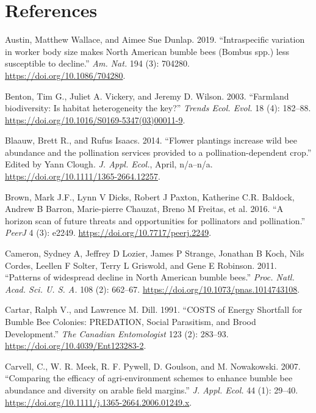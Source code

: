 \documentclass[11pt,]{article}
\begin{document}
\newpage

\hypertarget{references}{%
\section*{References}\label{references}}

\hypertarget{refs}{}
\leavevmode\hypertarget{ref-Austin2019}{}%
Austin, Matthew Wallace, and Aimee Sue Dunlap. 2019. ``Intraspecific
variation in worker body size makes North American bumble bees (Bombus
spp.) less susceptible to decline.'' \emph{Am. Nat.} 194 (3): 704280.
\url{https://doi.org/10.1086/704280}.

\leavevmode\hypertarget{ref-Benton2003}{}%
Benton, Tim G., Juliet A. Vickery, and Jeremy D. Wilson. 2003.
``Farmland biodiversity: Is habitat heterogeneity the key?''
\emph{Trends Ecol. Evol.} 18 (4): 182--88.
\url{https://doi.org/10.1016/S0169-5347(03)00011-9}.

\leavevmode\hypertarget{ref-Blaauw2014}{}%
Blaauw, Brett R., and Rufus Isaacs. 2014. ``Flower plantings increase
wild bee abundance and the pollination services provided to a
pollination-dependent crop.'' Edited by Yann Clough. \emph{J. Appl.
Ecol.}, April, n/a--n/a. \url{https://doi.org/10.1111/1365-2664.12257}.

\leavevmode\hypertarget{ref-Brown2016a}{}%
Brown, Mark J.F., Lynn V Dicks, Robert J Paxton, Katherine C.R. Baldock,
Andrew B Barron, Marie-pierre Chauzat, Breno M Freitas, et al. 2016. ``A
horizon scan of future threats and opportunities for pollinators and
pollination.'' \emph{PeerJ} 4 (3): e2249.
\url{https://doi.org/10.7717/peerj.2249}.

\leavevmode\hypertarget{ref-Cameron2011}{}%
Cameron, Sydney A, Jeffrey D Lozier, James P Strange, Jonathan B Koch,
Nils Cordes, Leellen F Solter, Terry L Griswold, and Gene E Robinson.
2011. ``Patterns of widespread decline in North American bumble bees.''
\emph{Proc. Natl. Acad. Sci. U. S. A.} 108 (2): 662--67.
\url{https://doi.org/10.1073/pnas.1014743108}.

\leavevmode\hypertarget{ref-Cartar1991}{}%
Cartar, Ralph V., and Lawrence M. Dill. 1991. ``COSTS of Energy
Shortfall for Bumble Bee Colonies: PREDATION, Social Parasitism, and
Brood Development.'' \emph{The Canadian Entomologist} 123 (2): 283--93.
\url{https://doi.org/10.4039/Ent123283-2}.

\leavevmode\hypertarget{ref-Carvell2007}{}%
Carvell, C., W. R. Meek, R. F. Pywell, D. Goulson, and M. Nowakowski.
2007. ``Comparing the efficacy of agri-environment schemes to enhance
bumble bee abundance and diversity on arable field margins.'' \emph{J.
Appl. Ecol.} 44 (1): 29--40.
\url{https://doi.org/10.1111/j.1365-2664.2006.01249.x}.
\end{document}
